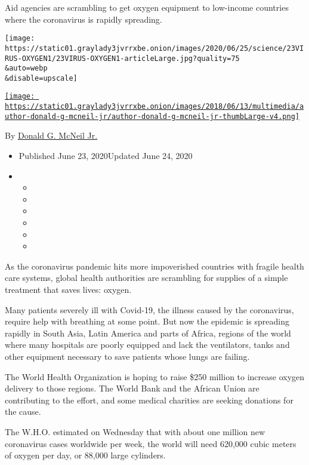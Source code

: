 Aid agencies are scrambling to get oxygen equipment to low-income
countries where the coronavirus is rapidly spreading.

\texttt{[image: https://static01.graylady3jvrrxbe.onion/images/2020/06/25/science/23VIRUS-OXYGEN1/23VIRUS-OXYGEN1-articleLarge.jpg?quality=75\\\&auto=webp\\\&disable=upscale]}

\href{https://www.nytimes3xbfgragh.onion/by/donald-g-mcneil-jr}{\texttt{[image: https://static01.graylady3jvrrxbe.onion/images/2018/06/13/multimedia/author-donald-g-mcneil-jr/author-donald-g-mcneil-jr-thumbLarge-v4.png]}}

By
\href{https://www.nytimes3xbfgragh.onion/by/donald-g-mcneil-jr}{Donald
G. McNeil Jr.}

\begin{itemize}
\item
  Published June 23, 2020Updated June 24, 2020
\item
  \begin{itemize}
  \item
  \item
  \item
  \item
  \item
  \item
  \end{itemize}
\end{itemize}

As the coronavirus pandemic hits more impoverished countries with
fragile health care systems, global health authorities are scrambling
for supplies of a simple treatment that saves lives: oxygen.

Many patients severely ill with Covid-19, the illness caused by the
coronavirus, require help with breathing at some point. But now the
epidemic is spreading rapidly in South Asia, Latin America and parts of
Africa, regions of the world where many hospitals are poorly equipped
and lack the ventilators, tanks and other equipment necessary to save
patients whose lungs are failing.

The World Health Organization is hoping to raise \$250 million to
increase oxygen delivery to those regions. The World Bank and the
African Union are contributing to the effort, and some medical charities
are seeking donations for the cause.

The W.H.O. estimated on Wednesday that with about one million new
coronavirus cases worldwide per week, the world will need 620,000 cubic
meters of oxygen per day, or 88,000 large cylinders.

